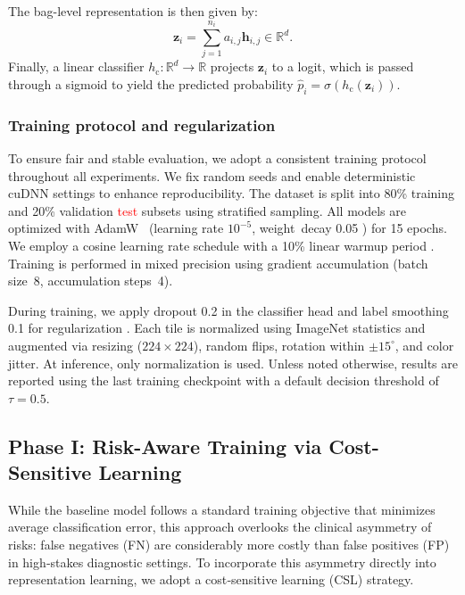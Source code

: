 \documentclass[sigconf,review,anonymous]{acmart}
\theoremstyle{remark}
\begin{document}
The bag-level representation is then given by:
\begin{equation*}
    \mathbf{z}_i = \sum_{j=1}^{n_i} a_{i,j} \mathbf{h}_{i,j} \in \mathbb{R}^{d}.
\end{equation*}
Finally, a linear classifier \( h_{\mathrm{c}}: \mathbb{R}^{d} \to \mathbb{R} \) projects \( \mathbf{z}_i \) to a logit, which is passed through a sigmoid to yield the predicted probability \(\hat{p}_i = \sigma(h_{\mathrm{c}}(\mathbf{z}_i))\).

\subsubsection{Training protocol and regularization}
To ensure fair and stable evaluation, we adopt a consistent training protocol throughout all experiments. We fix random seeds and enable deterministic cuDNN settings to enhance reproducibility. The dataset is split into 80\% training and 20\% validation \textcolor{red}{test} subsets using stratified sampling. All models are optimized with AdamW~\cite{loshchilov2017decoupled} (learning rate $10^{-5}$, weight~{}decay 0.05 ) for 15 epochs. We employ a cosine learning rate schedule with a 10\% linear warmup period \cite{loshchilov2016sgdr}. Training is performed in mixed precision \cite{micikevicius2017mixed} using gradient accumulation (batch size~8, accumulation steps~4).

During training, we apply dropout 0.2 in the classifier head and label smoothing 0.1 for regularization 
\cite{szegedy2016rethinking}. Each tile is normalized using ImageNet statistics \cite{imagenet} and augmented via resizing ($224\times224$), random flips, rotation within $\pm 15^{\circ}$, and color jitter. At inference, only normalization is used. Unless noted otherwise, results are reported using the last training checkpoint with a default decision threshold of $\tau=0.5$.

\subsection{Phase I: Risk-Aware Training via Cost-Sensitive Learning}\label{sec:phase1_method}

While the baseline model follows a standard training objective that minimizes average classification error, this approach overlooks the clinical asymmetry of risks: false negatives (FN) are considerably more costly than false positives (FP) in high‑stakes diagnostic settings. To incorporate this asymmetry directly into representation learning, we adopt a cost‑sensitive learning (CSL) strategy.
\end{document}
